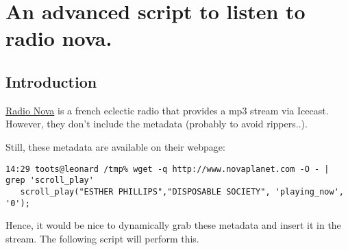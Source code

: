 \section{An advanced script to listen to radio nova.}
\subsection{Introduction}
\href{http://www.novaplanet.com/}{Radio Nova} is a french eclectic radio that provides a mp3 stream
via Icecast. However, they don't include the metadata (probably to avoid rippers..).

Still, these metadata are available on their webpage:

\begin{verbatim}
14:29 toots@leonard /tmp% wget -q http://www.novaplanet.com -O - | grep 'scroll_play'
   scroll_play("ESTHER PHILLIPS","DISPOSABLE SOCIETY", 'playing_now', '0');
\end{verbatim}
Hence, it would be nice to dynamically grab these metadata and insert it in the stream. The following 
script will perform this.


